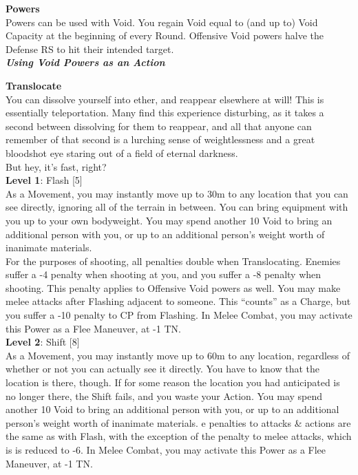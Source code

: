 \documentclass[a4paper, twocolumn, openany]{book}
\newlength{\indentlen}
\newcommand{\tabto}[1]{\setlength{\leftskip}{#1\indentlen}}
\begin{document}
{%
{\bfseries Powers\\}
Powers can be used with Void. You regain Void equal to (and up to) Void Capacity at the
beginning of every Round. Offensive Void powers halve the Defense RS to hit their intended
target.\\

{\bfseries\slshape Using Void Powers as an Action\\}

{\bfseries\large Translocate\\}
You can dissolve yourself into ether, and reappear elsewhere at will! This is essentially
teleportation. Many find this experience disturbing, as it takes a second between dissolving for
them to reappear, and all that anyone can remember of that second is a lurching sense of
weightlessness and a great bloodshot eye staring out of a field of eternal darkness.\\
But hey, it’s fast, right?\\

	\tabto{1}
	{\bfseries Level 1}: Flash [5]\\
	As a Movement, you may instantly move up to 30m to any location that you can see
	directly, ignoring all of the terrain in between. You can bring equipment with you up to
	your own bodyweight. You may spend another 10 Void to bring an additional person with
	you, or up to an additional person’s weight worth of inanimate materials.\\
	For the purposes of shooting, all penalties double when Translocating. Enemies suffer a
	-4 penalty when shooting at you, and you suffer a -8 penalty when shooting. This penalty
	applies to Offensive Void powers as well. You may make melee attacks after Flashing
	adjacent to someone. This “counts” as a Charge, but you suffer a -10 penalty to CP from
	Flashing. In Melee Combat, you may activate this Power as a Flee Maneuver, at -1 TN.\\

		\tabto{2}
		{\bfseries Level 2}: Shift [8]\\
		As a Movement, you may instantly move up to 60m to any location, regardless of
		whether or not you can actually see it directly. You have to know that the location
		is there, though. If for some reason the location you had anticipated is no longer
		there, the Shift fails, and you waste your Action. You may spend another 10 Void
		to bring an additional person with you, or up to an additional person’s weight
		worth of inanimate materials. e penalties to attacks \& actions are the same as
		with Flash, with the exception of the penalty to melee attacks, which is is reduced
		to -6. In Melee Combat, you may activate this Power as a Flee Maneuver, at -1
		TN.\\

}
\end{document}
